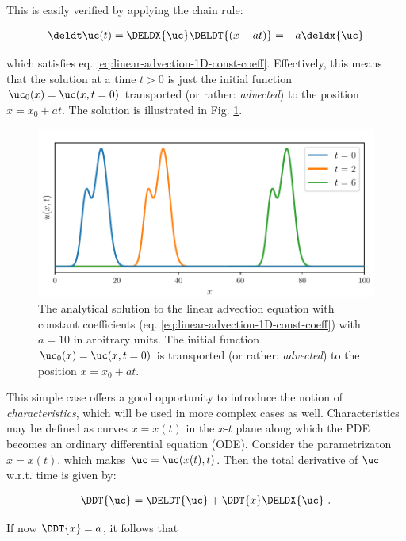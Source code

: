 This is easily verified by applying the chain rule:

\begin{align}
    \deldt \uc(t) = \DELDX{\uc} \DELDT{(x - at)} = - a \deldx{\uc}
\end{align}

which satisfies eq. \ref{eq:linear-advection-1D-const-coeff}. Effectively, this means that the
solution at a time $t > 0$ is just the initial function $\uc_0(x) = \uc(x, t=0)$ transported (or
rather: \emph{advected}) to the position $x = x_0 + a t$. The solution is illustrated in Fig.
\ref{fig:linear-advection-theory}.


\begin{figure}[H]
    \centering
	\includegraphics[width=.8\linewidth]{./figures/FV/linear_advection_solution.pdf}%
	\caption[Analytical solution of the linear advection equation with constant coefficients]{
        The analytical solution to the linear advection equation with constant coefficients (eq.
        \ref{eq:linear-advection-1D-const-coeff}) with $a = 10$ in arbitrary units. The initial
        function $\uc_0(x) = \uc(x, t=0)$ is transported (or rather: \emph{advected}) to the
        position $x = x_0 + a t$.
	}
    \label{fig:linear-advection-theory}
\end{figure}


This simple case offers a good opportunity to introduce the notion of \emph{characteristics}, which
will be used in more complex cases as well.  Characteristics may be defined as curves $x = x(t)$
in the $x$-$t$ plane along which the PDE becomes an ordinary differential equation (ODE). Consider
the parametrizaton $x = x(t)$, which makes $\uc = \uc(x(t), t)$. Then the total derivative of $\uc$
w.r.t. time is given by:

\begin{align}
    \DDT{\uc} = \DELDT{\uc} + \DDT{x} \DELDX{\uc} \ .
\end{align}

If now $\DDT{x} = a$, it follows that

